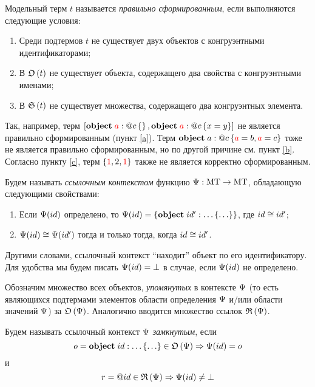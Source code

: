 \begin{Def}
Модельный терм $t$ называется \emph{правильно сформированным}, если выполняются следующие условия:
\begin{enumerate}
\item Среди подтермов $t$ не существует двух объектов с конгруэнтными идентификаторами; \label{a}
\item В $\mathfrak{O}\left(t\right)$ не существует объекта, содержащего два свойства с конгруэнтными именами; \label{b}
\item В $\mathfrak{S}\left(t\right)$ не существует множества, содержащего два конгруэнтных элемента. \label{c}
\end{enumerate}
\end{Def}

Так, например, терм $\left[\mathbf{object}\;{\color{red}a} : @c\left\{  \right\}, \mathbf{object}\;{\color{red}a} : @c\left\{ x=y \right\}\right]$ не является правильно сформированным (пункт \ref{a}). Терм $\mathbf{object}\;a : @c\left\{ {\color{red}a} = b, {\color{red}a} = c \right\}$ тоже не является правильно сформированным, но по другой причине см. пункт \ref{b}. Согласно пункту \ref{c}, терм $\left\{{\color{red}1}, 2, {\color{red}1}\right\}$ также не является корректно сформированным.

\begin{Def}
Будем называть \emph{ссылочным контекстом} функцию 
\mbox{$\Psi : \mbox{MT} \rightarrow \mbox{MT}$}, обладающую следующими свойствами: 
\begin{enumerate}
\item Если $\Psi(id)$ определено, то $\Psi(id) = \left\{\mathbf{object}\;id' : \ldots\left\{ \ldots \right\}\right\}$, где $id \cong id'$;
\item $\Psi(id) \cong \Psi(id')$ тогда и только тогда, когда $id \cong id'$.
\end{enumerate}
\end{Def}

Другими словами, ссылочный контекст ``находит'' объект по его идентификатору. Для удобства мы будем писать $\Psi(id)=\bot$ в случае, если $\Psi(id)$ не определено.

Обозначим множество всех объектов, \emph{упомянутых} в контексте $\Psi$ (то есть являющихся подтермами элементов области определения $\Psi$ и/или области значений $\Psi$) за $\mathfrak{O}\left(\Psi\right)$. Аналогично вводится множество ссылок $\mathfrak{R}\left(\Psi\right)$.

\begin{Def}\label{RContext}
Будем называть ссылочный контекст $\Psi$ \emph{замкнутым}, если 
$$
	o=\mathbf{object}\;id : \ldots\left\{ \ldots \right\} \in \mathfrak{O}\left(\Psi\right) \Rightarrow \Psi(id)=o
$$
и
$$
	r=@id \in \mathfrak{R}\left(\Psi\right) \Rightarrow \Psi(id) \neq \bot
$$
\end{Def}

